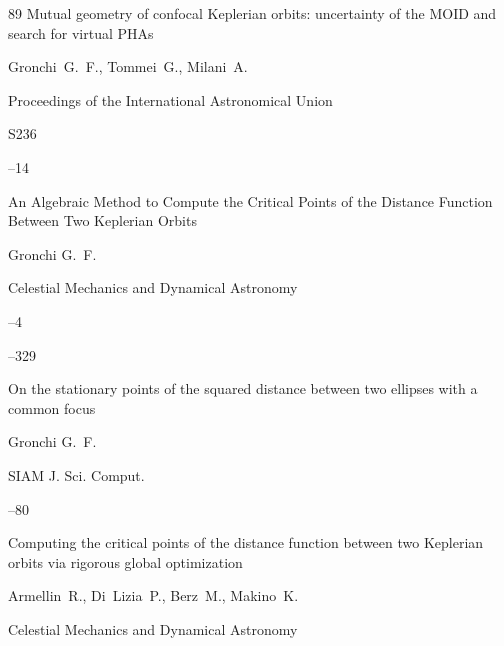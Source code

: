 \begin{thebibliography}{89}
\paper Mutual geometry of confocal Keplerian orbits: uncertainty of the MOID and search for virtual PHAs

\by Gronchi~G.~F., Tommei~G., Milani~A.

\jour  Proceedings of the International Astronomical Union



\issue S236  

--14






\paper An Algebraic Method to Compute the Critical Points of the Distance Function Between Two Keplerian Orbits

\by Gronchi G.~F. 

\jour Celestial Mechanics and Dynamical Astronomy



--4

--329






\paper On the stationary points of the squared distance between two ellipses with a common focus

\by Gronchi G.~F. 

\jour SIAM J. Sci. Comput.




--80






\paper Computing the critical points of the distance function between two Keplerian orbits via rigorous global optimization

\by Armellin~R., Di~Lizia~P., Berz~M., Makino~K.

\jour Celestial Mechanics and Dynamical Astronomy



\end{thebibliography}
